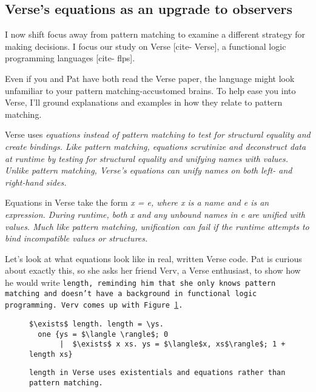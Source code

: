 \documentclass[manuscript,screen,review, 12pt]{acmart}
\begin{document}
    \subsection{Verse's equations as an upgrade to observers}
    \label{verseoverobservers}
    
    
    
    I now shift focus away from pattern matching to examine a different strategy
    for making decisions. I focus our study on Verse [cite- Verse], a functional
    logic programming languages [cite- flps]. 

    Even if you and Pat have both read the Verse paper, the language might look
    unfamiliar to your pattern matching-accustomed brains. To help ease you into
    Verse, I'll ground explanations and examples in how they relate to pattern
    matching. 

    Verse uses \it{equations} instead of pattern matching to test for structural
    equality and create bindings. Like pattern matching, equations scrutinize
    and deconstruct data at runtime by testing for structural equality and
    unifying names with values. Unlike pattern matching, Verse's equations can
    unify names on both left- \it{and} right-hand sides. 
    
    Equations in Verse take the form \it{x = e}, where \it{x} is a name and
    \it{e} is an expression. During runtime, both \it{x} and any unbound names
    in \it{e} are unified with values. Much like pattern matching, unification
    can fail if the runtime attempts to bind incompatible values or structures. 

    Let's look at what equations look like in real, written Verse code. Pat is
    curious about exactly this, so she asks her friend Verv, a Verse enthusiast,
    to show how he would write \tt{length}, reminding him that she only knows
    pattern matching and doesn't have a background in functional logic
    programming. Verv comes up with Figure~\ref{fig:verselen}. 
    
    

    \begin{figure}[h]
        \verselst
        \begin{lstlisting}[numbers=none]
$\exists$ length. length = \ys. 
  one {ys = $\langle \rangle$; 0
       |  $\exists$ x xs. ys = $\langle$x, xs$\rangle$; 1 + length xs}
        \end{lstlisting}
    \caption{\tt{length} in Verse uses existentials and equations rather than
    pattern matching.} 
    \label{fig:verselen}
    \end{figure}
\end{document}
